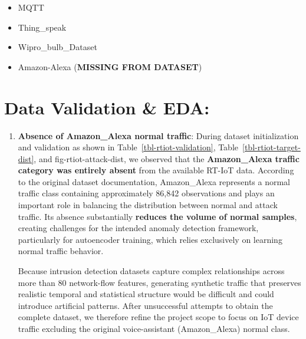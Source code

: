 \documentclass[
  letterpaper,
  DIV=11,
  numbers=noendperiod]{scrartcl}
\providecommand{\tightlist}{%
  \setlength{\itemsep}{0pt}\setlength{\parskip}{0pt}}
\begin{document}
\begin{enumerate}
\begin{itemize}
    \begin{itemize}
    \tightlist
    \item
      MQTT
    \item
      Thing\_speak
    \item
      Wipro\_bulb\_Dataset
    \item
      Amazon-Alexa (\textbf{MISSING FROM DATASET})
    \end{itemize}
  \end{itemize}
\end{enumerate}

\section{Data Validation \& EDA:}\label{data-validation-eda}

\begin{enumerate}
\def\labelenumi{\arabic{enumi}.}
\item
  \textbf{Absence of Amazon\_Alexa normal traffic}: During dataset
  initialization and validation as shown in
  Table~\ref{tbl-rtiot-validation}, Table~\ref{tbl-rtiot-target-dist},
  and fig-rtiot-attack-dist, we observed that the \textbf{Amazon\_Alexa
  traffic category was entirely absent} from the available RT-IoT data.
  According to the original dataset documentation, Amazon\_Alexa
  represents a normal traffic class containing approximately 86,842
  observations and plays an important role in balancing the distribution
  between normal and attack traffic. Its absence substantially
  \textbf{reduces the volume of normal samples}, creating challenges for
  the intended anomaly detection framework, particularly for autoencoder
  training, which relies exclusively on learning normal traffic
  behavior.

  Because intrusion detection datasets capture complex relationships
  across more than 80 network-flow features, generating synthetic
  traffic that preserves realistic temporal and statistical structure
  would be difficult and could introduce artificial patterns. After
  unsuccessful attempts to obtain the complete dataset, we therefore
  refine the project scope to focus on IoT device traffic excluding the
  original voice-assistant (Amazon\_Alexa) normal class.


\end{enumerate}
\end{document}
